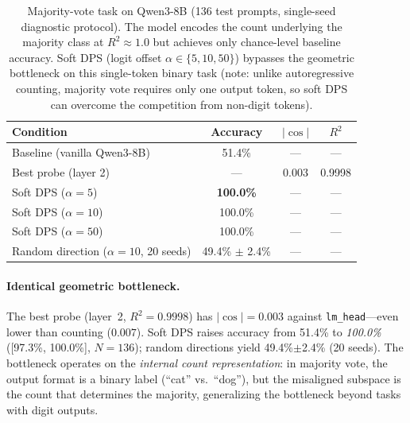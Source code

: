 \documentclass{article}
\begin{document}
\begin{table}[h]
\centering
\caption{Majority-vote task on Qwen3-8B (136 test prompts, single-seed diagnostic protocol).
The model encodes the count underlying the majority class at $R^2 \approx 1.0$
but achieves only chance-level baseline accuracy.
Soft DPS (logit offset $\alpha \in \{5,10,50\}$) bypasses the geometric bottleneck
on this single-token binary task (note: unlike autoregressive counting, majority vote
requires only one output token, so soft DPS can overcome the competition from
non-digit tokens).}
\label{tab:majority_vote}
\begin{tabular}{lccc}
\toprule
Condition & Accuracy & $|\cos|$ & $R^2$ \\
\midrule
Baseline (vanilla Qwen3-8B) & 51.4\% & --- & --- \\
Best probe (layer 2) & --- & 0.003 & 0.9998 \\
Soft DPS ($\alpha=5$) & \textbf{100.0\%} & --- & --- \\
Soft DPS ($\alpha=10$) & 100.0\% & --- & --- \\
Soft DPS ($\alpha=50$) & 100.0\% & --- & --- \\
Random direction ($\alpha=10$, 20 seeds) & 49.4\% $\pm$ 2.4\% & --- & --- \\
\bottomrule
\end{tabular}
\end{table}

\paragraph{Identical geometric bottleneck.}
The best probe (layer~2, $R^2 = 0.9998$) has $|\cos| = 0.003$ against
\texttt{lm\_head}---even lower than counting ($0.007$).
Soft DPS raises accuracy from 51.4\% to \emph{100.0\%} ([97.3\%, 100.0\%], $N{=}136$);
random directions yield 49.4\%$\pm$2.4\% (20 seeds).
The bottleneck operates on the \emph{internal count representation}:
in majority vote, the output format is a binary label (``cat'' vs.\ ``dog''),
but the misaligned subspace is the count that determines the majority,
generalizing the bottleneck beyond tasks with digit outputs.
\end{document}
